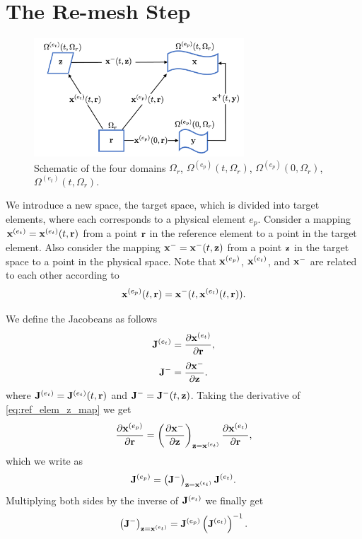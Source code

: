 \documentclass[11pt]{report}
\begin{document}
\chapter{The Re-mesh Step}
\begin{figure}[ht]
    \centering
    \includegraphics[width=0.7\textwidth]{../../images/four_spaces.pdf}
    \caption{Schematic of the four domains $\Omega_r$, $\Omega^{(e_p)}(t,\Omega_r)$, $\Omega^{(e_p)}(0,\Omega_r)$, $\Omega^{(e_t)}(t,\Omega_r)$.}
    \label{fig:four_spaces}
 \end{figure}
We introduce a new space, the target space, which is divided into target elements, where each corresponds to a physical element $e_p$. Consider a mapping $\mathbf{x}^{(e_t)}=\mathbf{x}^{(e_t)}(t,\mathbf{r})$ from a point $\mathbf{r}$ in the reference element to a point in the target element. Also consider the mapping $\mathbf{x}^- = \mathbf{x}^-(t,\mathbf{z})$ from a point $\mathbf{z}$ in the target space to a point in the physical space. Note that $\mathbf{x}^{(e_p)}$, $\mathbf{x}^{(e_t)}$, and $\mathbf{x}^-$ are related to each other according to
\begin{equation}
    \label{eq:ref_elem_z_map}
    \mathbf{x}^{(e_p)}(t,\mathbf{r}) = \mathbf{x}^-(t,\mathbf{x}^{(e_t)}(t,\mathbf{r})).
\end{equation}

We define the Jacobeans as follows
\begin{equation}
    \mathbf{J}^{(e_t)} = \frac{\partial \mathbf{x}^{(e_t)}}{\partial \mathbf{r}},
\end{equation}
\begin{equation}
    \mathbf{J}^- = \frac{\partial \mathbf{x}^-}{\partial \mathbf{z}}.
\end{equation}
where $\mathbf{J}^{(e_t)} = \mathbf{J}^{(e_t)}(t,\mathbf{r})$ and $\mathbf{J}^-=\mathbf{J}^-(t,\mathbf{z})$. Taking the derivative of \cref{eq:ref_elem_z_map} we get
\begin{equation}
    \frac{\partial \mathbf{x}^{(e_p)}}{\partial \mathbf{r}} = \left( \frac{ \partial \mathbf{x}^-}{\partial \mathbf{z}} \right)_{\mathbf{z}=\mathbf{x}^{(e_t)}} \frac{ \partial \mathbf{x}^{(e_t)} }{ \partial \mathbf{r}},
\end{equation}
which we write as
\begin{equation}
    \mathbf{J}^{(e_p)} = \left( \mathbf{J}^- \right)_{\mathbf{z}=\mathbf{x}^{(e_t)}} \mathbf{J}^{(e_t)}.
\end{equation}
Multiplying both sides by the inverse of $\mathbf{J}^{(e_t)}$ we finally get
\begin{equation}
    \left( \mathbf{J}^- \right)_{\mathbf{z}=\mathbf{x}^{(e_t)}} = \mathbf{J}^{(e_p)} \left( \mathbf{J}^{(e_t)} \right)^{-1}.
\end{equation}
\end{document}
